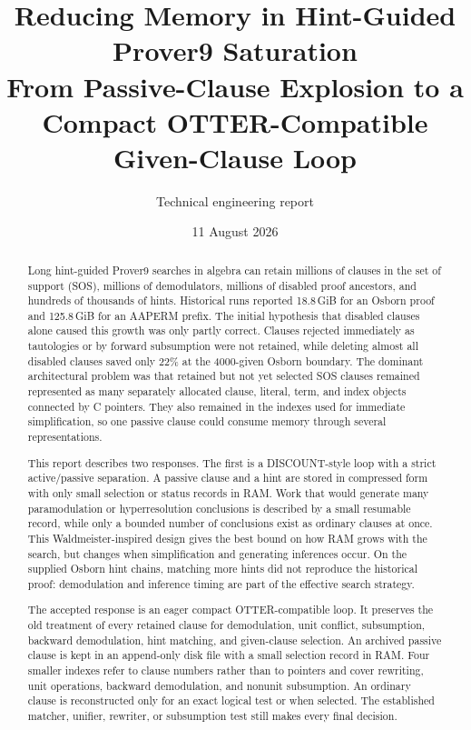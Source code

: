 \documentclass[11pt]{article}
\title{Reducing Memory in Hint-Guided Prover9 Saturation\\
\large From Passive-Clause Explosion to a Compact
OTTER-Compatible Given-Clause Loop}
\author{Technical engineering report}
\date{11 August 2026}
\begin{document}
\maketitle

\begin{abstract}
Long hint-guided Prover9 searches in algebra can retain millions of clauses in
the set of support (SOS), millions of demodulators, millions of disabled proof
ancestors, and hundreds of thousands of hints.  Historical runs reported
18.8\,GiB for an Osborn proof and 125.8\,GiB for an AAPERM prefix.  The initial
hypothesis that disabled clauses alone caused this growth was only partly
correct.  Clauses rejected immediately as tautologies or by forward
subsumption were not retained, while deleting almost all disabled clauses saved
only 22\% at the 4000-given Osborn boundary.  The dominant architectural
problem was that retained but not yet selected SOS clauses remained represented
as many separately allocated clause, literal, term, and index objects connected
by C pointers.  They also remained in the indexes used for immediate
simplification, so one passive clause could consume memory through several
representations.

This report describes two responses.  The first is a DISCOUNT-style loop with a
strict active/passive separation.  A passive clause and a hint are stored in
compressed form with only small selection or status records in RAM.  Work that
would generate many paramodulation or hyperresolution conclusions is described
by a small resumable record, while only a bounded number of conclusions exist
as ordinary clauses at once.  This Waldmeister-inspired design gives the best
bound on how RAM grows with the search, but changes when simplification and
generating inferences occur.  On the supplied Osborn hint chains, matching more
hints did not reproduce the historical proof: demodulation and inference timing
are part of the effective search strategy.

The accepted response is an eager compact OTTER-compatible loop.  It preserves
the old treatment of every retained clause for demodulation, unit conflict,
subsumption, backward demodulation, hint matching, and given-clause selection.
An archived passive clause is kept in an append-only disk file with a small selection
record in RAM.  Four smaller indexes refer to clause numbers rather than to
pointers and cover rewriting, unit operations, backward demodulation, and
nonunit subsumption.  An ordinary clause is reconstructed only for an exact
logical test or when selected.  The established matcher, unifier, rewriter, or
subsumption test still makes every final decision.


\end{abstract}
\end{document}
